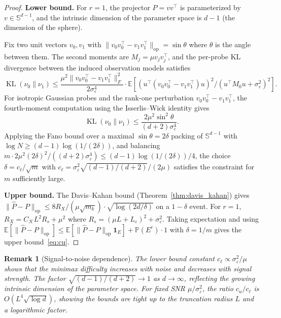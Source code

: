 \documentclass[12pt]{article}
\newcommand{\E}{\mathbb{E}}
\newcommand{\Prob}{\mathbb{P}}
\newcommand{\op}{\mathrm{op}}
\DeclareMathOperator{\KL}{KL}
\newtheorem{remark}{Remark}
\theoremstyle{plain}
\theoremstyle{definition}
\begin{document}
\begin{proof}
\textbf{Lower bound.}
For $r = 1$, the projector $P = vv^\top$ is parameterized by $v \in \mathbb{S}^{d-1}$, and the intrinsic dimension of the parameter space is $d - 1$ (the dimension of the sphere).

Fix two unit vectors $v_0, v_1$ with $\|v_0 v_0^\top - v_1 v_1^\top\|_{\op} = \sin\theta$ where $\theta$ is the angle between them. The second moments are $M_j = \mu v_j v_j^\top$, and the per-probe KL divergence between the induced observation models satisfies
\[
\KL(\nu_0 \| \nu_1) \le \frac{\mu^2 \|v_0 v_0^\top - v_1 v_1^\top\|_F^2}{2\sigma_\varepsilon^4} \cdot \E[(u^\top(v_0 v_0^\top - v_1 v_1^\top)u)^2 / (u^\top M_0 u + \sigma_\varepsilon^2)^2].
\]
For isotropic Gaussian probes and the rank-one perturbation $v_0 v_0^\top - v_1 v_1^\top$, the fourth-moment computation using the Isserlis--Wick identity gives
\[
\KL(\nu_0 \| \nu_1) \le \frac{2\mu^2 \sin^2\theta}{(d+2)\sigma_\varepsilon^4}.
\]
Applying the Fano bound over a maximal $\sin\theta = 2\delta$ packing of $\mathbb{S}^{d-1}$ with $\log N \ge (d-1)\log(1/(2\delta))$, and balancing $m \cdot 2\mu^2(2\delta)^2 / ((d+2)\sigma_\varepsilon^4) \le (d-1)\log(1/(2\delta))/4$, the choice $\delta = c_\ell / \sqrt{m}$ with $c_\ell = \sigma_\varepsilon^2 \sqrt{(d-1)/(d+2)} / (2\mu)$ satisfies the constraint for $m$ sufficiently large.

\textbf{Upper bound.}
The Davis--Kahan bound (Theorem~\ref{thm:davis_kahan}) gives $\|\widehat{P} - P\|_{\op} \le 8R_X / (\mu\sqrt{m_k}) \cdot \sqrt{\log(2d/\delta)}$ on a $1-\delta$ event. For $r = 1$, $R_X = C_{\mathcal{K}} L^2 R_s + \mu^2$ where $R_s = (\mu L + L_\varepsilon)^2 + \sigma_\varepsilon^2$. Taking expectation and using $\E[\|\widehat{P} - P\|_{\op}] \le \E[\|\widehat{P} - P\|_{\op} \mathbf{1}_{E}] + \Prob(E^c) \cdot 1$ with $\delta = 1/m$ gives the upper bound~\eqref{eq:cu}.
\end{proof}

\begin{remark}[Signal-to-noise dependence]
The lower bound constant $c_\ell \propto \sigma_\varepsilon^2 / \mu$ shows that the minimax difficulty increases with noise and decreases with signal strength. The factor $\sqrt{(d-1)/(d+2)} \to 1$ as $d \to \infty$, reflecting the growing intrinsic dimension of the parameter space. For fixed SNR $\mu/\sigma_\varepsilon^2$, the ratio $c_u/c_\ell$ is $O(L^4 \sqrt{\log d})$, showing the bounds are tight up to the truncation radius $L$ and a logarithmic factor.
\end{remark}
\end{document}

